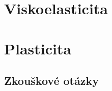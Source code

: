 \documentclass[a4paper, 10pt, oneside, draft]{report}
\numberwithin{equation}{part}
\begin{document}
\chapter{Viskoelasticita}






\chapter{Plasticita}













\appendix
\section*{Zkouškové otázky}
\end{document}
